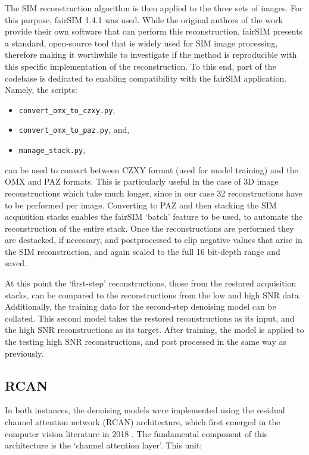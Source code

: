 \documentclass[12pt]{article}
\begin{document}
The SIM reconstruction algorithm is then applied to the three sets of images.
For this purpose, fairSIM 1.4.1 \cite{fairSIM} was used.
While the original authors of the work provide their own software that can perform this reconstruction,
fairSIM presents a standard, open-source tool that is widely used for SIM image processing,
therefore making it worthwhile to investigate if the method is reproducible with this specific implementation of the reconstruction.
To this end, part of the codebase is dedicated to enabling compatibility with the fairSIM application.
Namely, the scripts:
\begin{itemize}
    \item \texttt{convert\_omx\_to\_czxy.py},
    \item \texttt{convert\_omx\_to\_paz.py}, and,
    \item \texttt{manage\_stack.py},
\end{itemize}
can be used to convert between CZXY format (used for model training) and the OMX and PAZ formats.
This is particularly useful in the case of 3D image reconstructions which take much longer,
since in our case 32 reconstructions have to be performed per image.
Converting to PAZ and then stacking the SIM acquisition stacks enables the fairSIM `batch' feature to be used,
to automate the reconstruction of the entire stack.
Once the reconstructions are performed they are destacked,
if necessary, and postprocessed to clip negative values that arise in the SIM reconstruction,
and again scaled to the full 16 bit-depth range and saved.

At this point the `first-step' reconstructions, those from the restored acquisition stacks,
can be compared to the reconstructions from the low and high SNR data.
Additionally, the training data for the second-step denoising model can be collated.
This second model takes the restored reconstructions as its input, and the high SNR reconstructions as its target.
After training, the model is applied to the testing high SNR reconstructions, and post processed in the same way as previously.

\subsection{RCAN}

In both instances, the denoising models were implemented using the residual channel attention network (RCAN) architecture,
which first emerged in the computer vision literature in 2018 \cite{rcan2018}.
The fundamental component of this architecture is the `channel attention layer'.
This unit:
\end{document}
